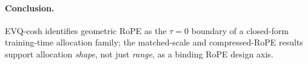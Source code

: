 \paragraph{Conclusion.}
EVQ-cosh identifies geometric RoPE as the $\tau{=}0$ boundary of a closed-form training-time allocation family; the matched-scale and compressed-RoPE results support allocation \emph{shape}, not just \emph{range}, as a binding RoPE design axis.
